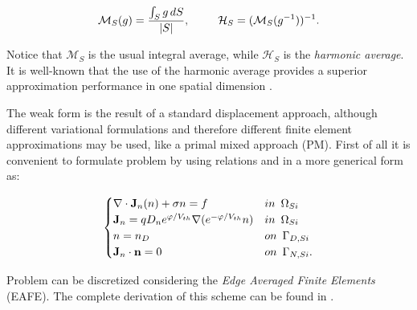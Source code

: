 \begin{equation*}
\mathcal{M}_S(g) = \dfrac{\int_S g \, dS}{|S|}, \psp{15} \mathcal{H}_S = (\mathcal{M}_S(g^{-1}))^{-1} .
\end{equation*}

Notice that $\mathcal{M}_S$ is the usual integral average, while $\mathcal{H}_S$ is the \textit{harmonic average}. It is well-known that the use of the harmonic average provides a superior approximation performance in one spatial dimension \cite{BabuskaMixMet}.

The weak form   is the result of a standard displacement approach, although different variational formulations and therefore different finite element approximations may be used, like a primal mixed approach (PM).  First of all it is convenient to formulate problem  by using relations  and  in a more generical form as:

\begin{equation}
\label{eq: LEC system slotboom generic}
\begin{cases}
\nabla \cdot \vect{J}_n(n)  +\sigma n = f & in \psp{3} \Omega_{Si}
 \\
 \vect{J}_n = qD_n e^{\varphi/V_{th}} \nabla (e^{-\varphi/V_{th}}n) & in \psp{3} \Omega_{Si}\\
n = n_D & on \psp{3} \Gamma_{D,Si}
 \\
 \vect{J}_n \cdot \vect{n} = 0 & on \psp{3} \Gamma_{N,Si}.
\end{cases}
\end{equation}

Problem  can be discretized considering the \textit{Edge Averaged Finite Elements} (EAFE). The complete derivation of this scheme can be found in \cite{Zikatanov:EAFE1} \cite{Zikatanov:EAFE2}.

